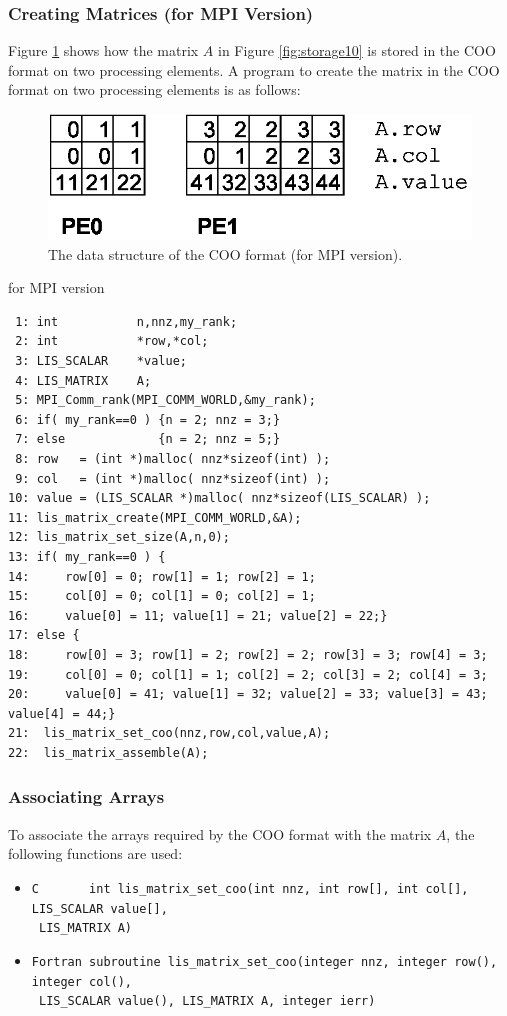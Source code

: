\documentclass[a4paper]{article}
\begin{document}
\subsubsection{Creating Matrices (for MPI Version)}
Figure \ref{fig:storage10_mpi} shows how the matrix $A$ in Figure
\ref{fig:storage10} is stored in the COO format on two processing
elements. A program to create the matrix in the COO format on two processing elements is as follows:
\begin{figure}[h]
{\centering 
\includegraphics{storage10_mpi.eps} 
\caption{The data structure of the COO format (for MPI version).}\label{fig:storage10_mpi}}
\end{figure}
\begin{itembox}[l]{for MPI version}
\small
\begin{verbatim}
 1: int           n,nnz,my_rank;
 2: int           *row,*col;
 3: LIS_SCALAR    *value;
 4: LIS_MATRIX    A;
 5: MPI_Comm_rank(MPI_COMM_WORLD,&my_rank);
 6: if( my_rank==0 ) {n = 2; nnz = 3;}
 7: else             {n = 2; nnz = 5;}
 8: row   = (int *)malloc( nnz*sizeof(int) );
 9: col   = (int *)malloc( nnz*sizeof(int) );
10: value = (LIS_SCALAR *)malloc( nnz*sizeof(LIS_SCALAR) );
11: lis_matrix_create(MPI_COMM_WORLD,&A);
12: lis_matrix_set_size(A,n,0);
13: if( my_rank==0 ) {
14:     row[0] = 0; row[1] = 1; row[2] = 1;
15:     col[0] = 0; col[1] = 0; col[2] = 1;
16:     value[0] = 11; value[1] = 21; value[2] = 22;}
17: else {
18:     row[0] = 3; row[1] = 2; row[2] = 2; row[3] = 3; row[4] = 3;
19:     col[0] = 0; col[1] = 1; col[2] = 2; col[3] = 2; col[4] = 3;
20:     value[0] = 41; value[1] = 32; value[2] = 33; value[3] = 43; value[4] = 44;}
21:  lis_matrix_set_coo(nnz,row,col,value,A);
22:  lis_matrix_assemble(A);
\end{verbatim}
\end{itembox}
\subsubsection{Associating Arrays}
To associate the arrays required by the COO format with the matrix $A$, the following functions are used:
\begin{itemize}
\item \verb|C       int lis_matrix_set_coo(int nnz, int row[], int col[], LIS_SCALAR value[],|\\
      \verb| LIS_MATRIX A)|
\item \verb|Fortran subroutine lis_matrix_set_coo(integer nnz, integer row(), integer col(),|\\
      \verb| LIS_SCALAR value(), LIS_MATRIX A, integer ierr)|
\end{itemize}
\end{document}
